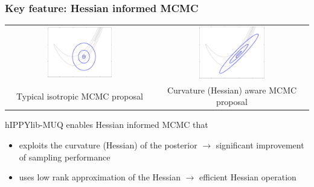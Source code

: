 \documentclass{beamer}
\begin{document}
\begin{frame}[c]
  \frametitle{Key feature: Hessian informed MCMC}

  \begin{tabulary}{\linewidth}{CC}
    \includegraphics[width=0.45\textwidth]{./figures/mcmcprop_iso.pdf}
    &
    \includegraphics[width=0.45\textwidth]{./figures/mcmcprop_curvature.pdf}
    \\
    Typical isotropic MCMC proposal
    &
    Curvature (Hessian) aware MCMC proposal
  \end{tabulary}

  \vspace{0.5cm}

  hIPPYlib-MUQ enables Hessian informed MCMC that
  \begin{itemize}
    \item exploits the curvature (Hessian) of the posterior $\rightarrow$
      significant improvement of sampling performance
    \item uses low rank approximation of the Hessian $\rightarrow$ efficient
      Hessian operation
  \end{itemize}

\end{frame}
\end{document}
